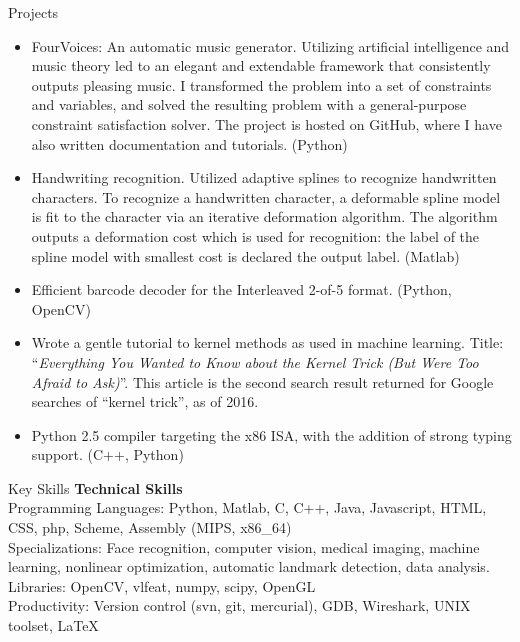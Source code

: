 \documentclass{resume}
\begin{document}
\begin{component}{Projects}
	\begin{itemize}
		\vspace{-0.5em}\item FourVoices: An automatic music generator. Utilizing artificial intelligence and music theory led to an elegant and extendable framework that consistently outputs pleasing music.
I transformed the problem into a set of constraints and variables, and solved the resulting problem with a general-purpose constraint satisfaction solver.
The project is hosted on GitHub, where I have also written documentation and tutorials.
		(Python)
        \vspace{-0.5em}\item Handwriting recognition. Utilized adaptive splines to recognize handwritten characters.
To recognize a handwritten character, a deformable spline model is fit to the character via an iterative deformation algorithm.
The algorithm outputs a deformation cost which is used for recognition: the label of the spline model with smallest cost is declared the output label.
(Matlab)
        \vspace{-0.5em}\item Efficient barcode decoder
	        for the Interleaved 2-of-5 format. (Python, OpenCV)
        \vspace{-0.5em}\item Wrote a gentle tutorial to kernel methods as used in machine learning. Title: ``\emph{Everything You Wanted to Know about the Kernel Trick (But Were Too Afraid to Ask)}''. This article is the second search result returned for Google searches of ``kernel trick'', as of 2016.
		\vspace{-0.5em}\item Python 2.5 compiler targeting the x86 ISA, with the addition of
		strong typing support. (C++, Python)
	\end{itemize}
\end{component}

\vspace{-1.0em}

\begin{component}{Key Skills}
	\textbf{Technical Skills}\\
		Programming Languages: Python, Matlab, C, C++, Java, Javascript, HTML, CSS, php, Scheme, Assembly (MIPS, x86\_64)\\
        Specializations: Face recognition, computer vision, medical imaging, machine learning, nonlinear optimization, automatic landmark detection, data analysis.\\
		Libraries: OpenCV, vlfeat, numpy, scipy, OpenGL \\
		Productivity: Version control (svn, git, mercurial), GDB, Wireshark, UNIX toolset, LaTeX
\end{component}
\end{document}
